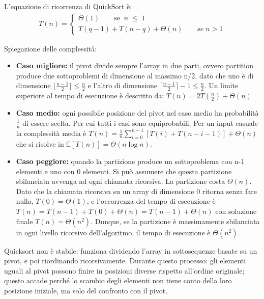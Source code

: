\documentclass[a4paper, 11pt]{article}
\begin{document}
\noindent L'equazione di ricorrenza di QuickSort è:
\begin{gather*}
    T(n) = 
    \begin{cases}
    \Theta(1)\quad\quad \text{se}\;\; n\; \leq\; 1 \\
    T(q - 1) + T(n - q) + \Theta(n)\quad\quad se\; n > 1
    \end{cases}     
\end{gather*}

\noindent Spiegazione delle complessità:
 
\begin{itemize}

  \item \textbf{Caso migliore:} il pivot divide sempre l'array in due parti, ovvero partition produce due sottoproblemi di dimensione al massimo n/2,
   dato che uno è di dimensione $\lfloor \frac{n-1}{2} \rfloor \leq \frac{n}{2}$ e 
   l'altro di dimensione $\lceil \frac{n-1}{2} \rceil - 1 \leq \frac{n}{2}$. 
   Un limite superiore al tempo di esecuzione è descritto da: $T(n) = 2T\left(\frac{n}{2}\right) + \Theta(n)$
  
  \item \textbf{Caso medio:} ogni possibile posizione del pivot nel caso medio ha probabilità $\frac{1}{n}$ di essere scelta. Per cui tutti i casi sono equiprobabili. 
  Per un input casuale la complessità media è $T(n) = \frac{1}{n}\sum_{i=0}^{n-1}\left[T(i) + T(n-i-1)\right] + \Theta(n)$ che si risolve in
   $\mathbb{E}[T(n)] = \Theta(n \log n)$.

  \item \textbf{Caso peggiore:} quando la partizione produce un sottoproblema con n-1 elementi e uno con 0 elementi. Si può assumere che questa 
  partizione sbilanciata avvenga ad ogni chiamata ricorsiva. La partizione costa $\Theta(n)$. Dato che la chiamata ricorsiva su un array di dimensione 
  0 ritorna senza fare nulla, $T(0) = \Theta(1)$, 
  e l'occorrenza del tempo di esecuzione è $T(n) = T(n-1) + T(0) + \Theta(n) = T(n-1) + \Theta(n)$ con soluzione finale $T(n) = \Theta(n^2)$. 
  Dunque, se la partizione è massimamente sbilanciata in ogni livello ricorsivo dell'algoritmo, il tempo di esecuzione è $\Theta(n^2)$.

\end{itemize}

\noindent Quicksort non è stabile: funziona dividendo l’array in sottosequenze basate su un pivot, e poi riordinando ricorsivamente. 
Durante questo processo: gli elementi uguali al pivot possono finire in posizioni diverse rispetto all’ordine originale; questo accade 
perché lo scambio degli elementi non tiene conto della loro posizione iniziale, ma solo del confronto con il pivot.
\end{document}
